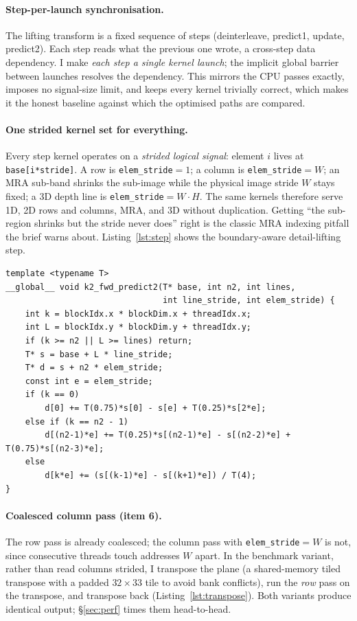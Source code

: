 \documentclass[11pt]{article}
\newcommand{\code}[1]{\texttt{#1}}
\begin{document}
\paragraph{Step-per-launch synchronisation.}
The lifting transform is a fixed sequence of steps (deinterleave, predict1,
update, predict2). Each step reads what the previous one wrote, a cross-step data
dependency. I make \emph{each step a single kernel launch}; the implicit global
barrier between launches resolves the dependency. This mirrors the CPU passes
exactly, imposes no signal-size limit, and keeps every kernel trivially correct,
which makes it the honest baseline against which the optimised paths are compared.

\paragraph{One strided kernel set for everything.}
Every step kernel operates on a \emph{strided logical signal}: element $i$ lives
at \code{base[i*stride]}. A row is \code{elem\_stride}$=1$; a column is
\code{elem\_stride}$=W$; an MRA sub-band shrinks the sub-image while the physical
image stride $W$ stays fixed; a 3D depth line is \code{elem\_stride}$=W\cdot H$.
The same kernels therefore serve 1D, 2D rows and columns, MRA, and 3D without
duplication. Getting ``the sub-region shrinks but the stride never does'' right is
the classic MRA indexing pitfall the brief warns about. Listing~\ref{lst:step}
shows the boundary-aware detail-lifting step.

\begin{lstlisting}[caption={Strided forward lifting step (predict2) with edge handling.},label=lst:step]
template <typename T>
__global__ void k2_fwd_predict2(T* base, int n2, int lines,
                                int line_stride, int elem_stride) {
    int k = blockIdx.x * blockDim.x + threadIdx.x;
    int L = blockIdx.y * blockDim.y + threadIdx.y;
    if (k >= n2 || L >= lines) return;
    T* s = base + L * line_stride;
    T* d = s + n2 * elem_stride;
    const int e = elem_stride;
    if (k == 0)
        d[0] += T(0.75)*s[0] - s[e] + T(0.25)*s[2*e];
    else if (k == n2 - 1)
        d[(n2-1)*e] += T(0.25)*s[(n2-1)*e] - s[(n2-2)*e] + T(0.75)*s[(n2-3)*e];
    else
        d[k*e] += (s[(k-1)*e] - s[(k+1)*e]) / T(4);
}
\end{lstlisting}

\paragraph{Coalesced column pass (item 6).}
The row pass is already coalesced; the column pass with \code{elem\_stride}$=W$ is
not, since consecutive threads touch addresses $W$ apart. In the benchmark variant, rather than read columns
strided, I transpose the plane (a shared-memory tiled transpose with a padded
$32\times33$ tile to avoid bank conflicts), run the \emph{row} pass on the
transpose, and transpose back (Listing~\ref{lst:transpose}). Both variants produce
identical output; \S\ref{sec:perf} times them head-to-head.
\end{document}
